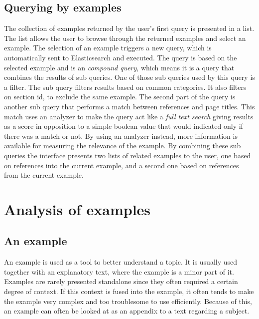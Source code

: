 \subsection{Querying by examples}
The collection of examples returned by the user's first query is presented in a list. The list allows the user to browse through the returned examples and select an example. The selection of an example triggers a new query, which is automatically sent to Elasticsearch and executed. The query is based on the selected example and is an \textit{compound query}, which means it is a query that combines the results of sub queries. One of those sub queries used by this query is a filter. The sub query filters results based on common categories. It also filters on section id, to exclude the same example. The second part of the query is another sub query that performs a match between references and page titles. This match uses an analyzer to make the query act like a \textit{full text search} giving results as a score in opposition to a simple boolean value that would indicated only if there was a match or not. By using an analyzer instead, more information is available for measuring the relevance of the example.
By combining these sub queries the interface presents two lists of related examples to the user, one based on references into the current example, and a second one based on references from the current example. %

\section{Analysis of examples} \label{examples-section} %

\subsection{An example}

An example is used as a tool to better understand a topic. It is usually used together with an explanatory text, where the example is a minor part of it. Examples are rarely presented standalone since they often required a certain degree of context. If this context is fused into the example, it often tends to make the example very complex and too troublesome to use efficiently. Because of this, an example can often be looked at as an appendix to a text regarding a subject. 

